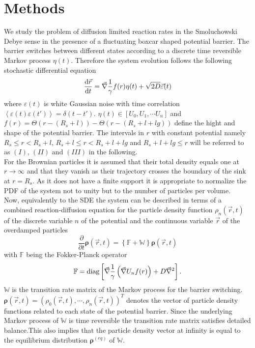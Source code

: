 \documentclass[twocolumn,superscriptaddress]{revtex4}
\newcommand{\vect}[1]{\boldsymbol{\mathbf{#1}}}
\begin{document}
\section{Methods} We study the problem of diffusion limited reaction rates in the Smoluchowski Debye sense \cite{Smoluchowski1917a, Debye1942} in the presence of a fluctuating boxcar shaped potential barrier. The barrier switches between different states according to a discrete time reversible Markov process $\eta(t)$. Therefore the system evolution follows the following stochastic differential equation
\begin{equation}
    \frac{{\rm d} \vec{r}}{{\rm d} t} = \vec{\nabla}\frac{1}{\gamma}f(r)\eta(t) + \sqrt{2D}\vec{\varepsilon}(t)
    \label{SDE}
\end{equation}
where $\varepsilon(t)$ is white Gaussian noise with time correlation $\left< \varepsilon(t) \varepsilon(t') \right> = \delta(t-t')$. $\eta(t) \in [U_0, U_1,\cdots U_n]$ and $f(r) = \Theta(r-(R_s+l))-\Theta(r-(R_s+l+lg))$ define the hight and shape of the potential barrier. The intervals in $r$ with constant potential namely $R_s \le r < R_s+l$, $R_s+l \le r < R_s+l+lg$ and $R_s+l+lg\le r$ will be referred to as $(I)$, $(II)$ and $(III)$ in the following.\\
For the Brownian particles it is assumed that their total density equals one at $r \rightarrow \infty$ and that they vanish as their trajectory crosses the boundary of the sink at $r = R_s$. As it does not have a finite support it is appropriate to normalize the PDF of the system not to unity but to the number of particles per volume. \\
Now, equivalently to the SDE the system can be described in terms of a combined reaction-diffusion equation for the particle density function $\rho_n(\vec{r},t)$ of the discrete variable $n$ of the potential and the continuous variable $\vec{r}$ of the overdamped particles
\begin{equation}
    \frac{\partial}{\partial t}\vect{\rho}(\vec{r},t) = \left\{ \mathbb{F} + \mathbb{W} \right\} \vect{\rho}(\vec{r},t)
    \label{mfpe}
\end{equation}
with $\mathbb{F}$ being the Fokker-Planck operator
\begin{equation}
    \mathbb{F} = {\rm  diag}\left[\vec{\nabla} \frac{1}{\gamma} \left(\vec{\nabla} U_n f(r)\right) + D\vec{\nabla}^{2} \right].
    \label{FPO}
\end{equation}
$\mathbb{W}$ is the transition rate matrix of the Markov process for the barrier switching. $\vect{\rho}(\vec{r},t)=(\rho_0(\vec{r},t),\cdots,\rho_n(\vec{r},t))^{T}$ denotes the vector of particle density functions related to each state of the potential barrier. Since the underlying Markov process of $\mathbb{W}$ is time reversible the transition rate matrix satisfies detailed balance.This also implies that the particle density vector at infinity is equal to the equilibrium distribution $\vect{\rho}^{(eq)}$ of $\mathbb{W}$. \\
\end{document}
